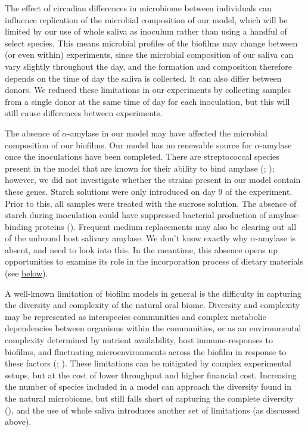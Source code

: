\documentclass[
  b5paper,
]{book}
\begin{document}
The effect of circadian differences in microbiome between individuals
can influence replication of the microbial composition of our model,
which will be limited by our use of whole saliva as inoculum rather than
using a handful of select species. This means microbial profiles of the
biofilms may change between (or even within) experiments, since the
microbial composition of our saliva can vary slightly throughout the
day, and the formation and composition therefore depends on the time of
day the saliva is collected. It can also differ between donors. We
reduced these limitations in our experiments by collecting samples from
a single donor at the same time of day for each inoculation, but this
will still cause differences between experiments.

The absence of \(\alpha\)-amylase in our model may have affected the
microbial composition of our biofilms. Our model has no renewable source
for \(\alpha\)-amylase once the inoculations have been completed. There
are streptococcal species present in the model that are known for their
ability to bind amylase
(;
);
however, we did not investigate whether the strains present in our model
contain these genes. Starch solutions were only introduced on day 9 of
the experiment. Prior to this, all samples were treated with the sucrose
solution. The absence of starch during inoculation could have suppressed
bacterial production of amylase-binding proteins
().
Frequent medium replacements may also be clearing out all of the unbound
host salivary amylase. We don't know exactly why \(\alpha\)-amylase is
absent, and need to look into this. In the meantime, this absence opens
up opportunities to examine its role in the incorporation process of
dietary materials (see \hyperref[bfmodels-in-arch]{below}).

A well-known limitation of biofilm models in general is the difficulty
in capturing the diversity and complexity of the natural oral biome.
Diversity and complexity may be represented as interspecies communities
and complex metabolic dependencies between organisms within the
communities, or as an environmental complexity determined by nutrient
availability, host immune-responses to biofilms, and fluctuating
microenvironments across the biofilm in response to these factors
(;
). These
limitations can be mitigated by complex experimental setups, but at the
cost of lower throughput and higher financial cost. Increasing the
number of species included in a model can approach the diversity found
in the natural microbiome, but still falls short of capturing the
complete diversity (), and the use of whole saliva introduces another set of
limitations (as discussed above).
\end{document}
